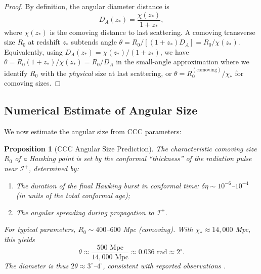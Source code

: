 \documentclass[11pt,a4paper]{article}
\theoremstyle{plain}
\newtheorem{proposition}[theorem]{Proposition}
\theoremstyle{definition}
\theoremstyle{remark}
\newcommand{\scriplus}{\mathcal{I}^+}
\begin{document}
\begin{proof}
By definition, the angular diameter distance is
\begin{equation}
    D_A(z_\ast) = \frac{\chi(z_\ast)}{1 + z_\ast},
\end{equation}
where $\chi(z_\ast)$ is the comoving distance to last scattering. A comoving transverse size $R_0$ at redshift $z_\ast$ subtends angle $\theta = R_0 / [(1+z_\ast) D_A] = R_0 / \chi(z_\ast)$. Equivalently, using $D_A(z_\ast) = \chi(z_\ast)/(1+z_\ast)$, we have $\theta = R_0(1+z_\ast)/\chi(z_\ast) = R_0/D_A$ in the small-angle approximation where we identify $R_0$ with the \emph{physical} size at last scattering, or $\theta = R_0^{(\text{comoving})}/\chi_\ast$ for comoving sizes.
\end{proof}

\subsection{Numerical Estimate of Angular Size}

We now estimate the angular size from CCC parameters:

\begin{proposition}[CCC Angular Size Prediction]\label{prop:numerical_angular}
The characteristic comoving size $R_0$ of a Hawking point is set by the conformal ``thickness'' of the radiation pulse near $\scriplus$, determined by:
\begin{enumerate}
    \item The duration of the final Hawking burst in conformal time: $\delta\eta \sim 10^{-6}$--$10^{-4}$ (in units of the total conformal age);
    \item The angular spreading during propagation to $\scriplus$.
\end{enumerate}
For typical parameters, $R_0 \sim 400$--$600$ Mpc (comoving). With $\chi_\ast \approx 14,000$ Mpc, this yields
\begin{equation}\label{eq:theta_numerical}
    \theta \approx \frac{500 \text{ Mpc}}{14,000 \text{ Mpc}} \approx 0.036 \text{ rad} \approx 2^\circ.
\end{equation}
The diameter is thus $2\theta \approx 3^\circ$--$4^\circ$, consistent with reported observations \cite{hawking_points_2020}.
\end{proposition}

\end{document}
